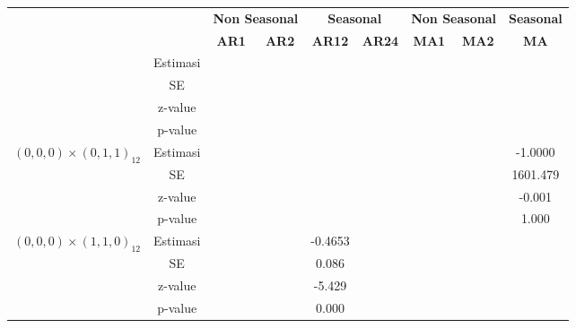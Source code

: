 \begin{enumerate}[label=\alph*.]
\begin{longtable}{|c|c|c|c|c|c|c|c|c|}
            & &
            \multicolumn{2}{c|}{\textbf{Non Seasonal}} &
            \multicolumn{2}{c|}{\textbf{Seasonal}} &
            \multicolumn{2}{c|}{\textbf{Non Seasonal}} &
            \textbf{Seasonal} \\ \cline{3-9}

            & &
            \textbf{AR1} & \textbf{AR2} &
            \textbf{AR12} & \textbf{AR24} &
            \textbf{MA1} & \textbf{MA2} &
            \textbf{MA} \\ \hline
            \endhead

            \hline
            \endfoot

            \hline
            \endlastfoot


            \hline
            \multirow{4}{*}{$(0,0,0)\times(0,1,0)_{12}$}
            & Estimasi & {} & {} & {} & {} & {} & {} & {} \\ \cline{2-9}
            & SE       & {} & {} & {} & {} & {} & {} & {}\\ \cline{2-9}
            & z-value  &  {}   & {} & {} & {} & {} & {} & {} \\ \cline{2-9}
            & p-value  & {} & {} & {} & {} & {} & {} & {} \\ \hline

            \multirow{4}{*}{$(0,0,0)\times(0,1,1)_{12}$}
            & Estimasi & {} & {} & {} & {} & {} & {} & -1.0000 \\ \cline{2-9}
            & SE       & {} & {} & {} & {} & {} & {} & 1601.479\\ \cline{2-9}
            & z-value  &  {}   & {} & {} & {} & {} & {} & -0.001 \\ \cline{2-9}
            & p-value  & {} & {} & {} & {} & {} & {} & 1.000 \\ \hline

            \multirow{4}{*}{$(0,0,0)\times(1,1,0)_{12}$}
            & Estimasi & {} & {} & -0.4653 & {} & {} & {} & {} \\ \cline{2-9}
            & SE       & {} & {} & 0.086 & {} & {} & {} & {}\\ \cline{2-9}
            & z-value  & {} & {} & -5.429 & {} & {} & {} & {}\\ \cline{2-9}
            & p-value  & {} & {} & 0.000 & {} & {} & {} & {}\\ \hline


\end{longtable}
\end{enumerate}
